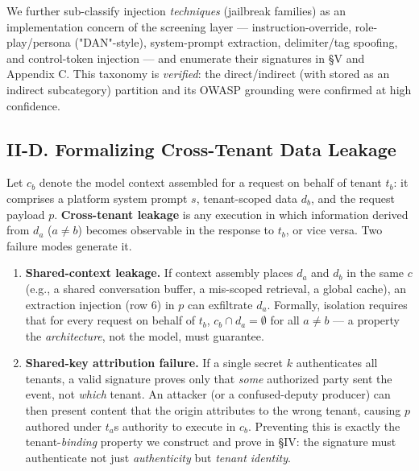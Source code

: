 We further sub-classify injection \emph{techniques} (jailbreak families)
as an implementation concern of the screening layer ---
instruction-override, role-play/persona ("DAN"-style), system-prompt
extraction, delimiter/tag spoofing, and control-token injection --- and
enumerate their signatures in §V and Appendix C. This taxonomy is
\emph{verified}: the direct/indirect (with stored as an indirect
subcategory) partition and its OWASP grounding were confirmed at high
confidence.

\subsection{II-D. Formalizing Cross-Tenant Data
Leakage}\label{ii-d-formalizing-cross-tenant-data-leakage}

Let \(c_b\) denote the model context assembled for a request on behalf
of tenant \(t_b\): it comprises a platform system prompt \(s\),
tenant-scoped data \(d_b\), and the request payload \(p\).
\textbf{Cross-tenant leakage} is any execution in which information
derived from \(d_{a}\) (\(a \neq b\)) becomes observable in the response
to \(t_b\), or vice versa. Two failure modes generate it.

\begin{enumerate}
\def\labelenumi{\arabic{enumi}.}
\tightlist
\item
  \textbf{Shared-context leakage.} If context assembly places \(d_a\)
  and \(d_b\) in the same \(c\) (e.g., a shared conversation buffer, a
  mis-scoped retrieval, a global cache), an extraction injection (row 6)
  in \(p\) can exfiltrate \(d_a\). Formally, isolation requires that for
  every request on behalf of \(t_b\), \(c_b \cap d_a = \emptyset\) for
  all \(a \neq b\) --- a property the \emph{architecture}, not the
  model, must guarantee.
\item
  \textbf{Shared-key attribution failure.} If a single secret \(k\)
  authenticates all tenants, a valid signature proves only that
  \emph{some} authorized party sent the event, not \emph{which} tenant.
  An attacker (or a confused-deputy producer) can then present content
  that the origin attributes to the wrong tenant, causing \(p\) authored
  under \(t_a\)\textquotesingle s authority to execute in \(c_b\).
  Preventing this is exactly the tenant-\emph{binding} property we
  construct and prove in §IV: the signature must authenticate not just
  \emph{authenticity} but \emph{tenant identity}.
\end{enumerate}

